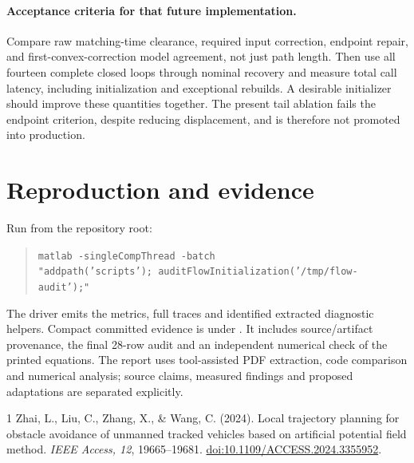 \documentclass[10pt]{article}
\begin{document}
\paragraph{Acceptance criteria for that future implementation.}
Compare raw matching-time clearance, required input correction, endpoint
repair, and first-convex-correction model agreement, not just path length.
Then use all fourteen complete closed loops through nominal recovery and
measure total call latency, including initialization and exceptional rebuilds.
A desirable initializer should improve these quantities together.
The present tail ablation fails the endpoint criterion, despite reducing
displacement, and is therefore not promoted into production.

\section{Reproduction and evidence}
Run from the repository root:
\begin{quote}\small
\texttt{matlab -singleCompThread -batch}\\
\texttt{"addpath('scripts'); auditFlowInitialization('/tmp/flow-audit');"}
\end{quote}
The driver emits the metrics, full traces and identified extracted diagnostic
helpers. Compact committed evidence is under
.
It includes source/artifact provenance, the final 28-row audit and an
independent numerical check of the printed equations.
The report uses tool-assisted PDF extraction, code comparison and numerical
analysis; source claims, measured findings and proposed adaptations are
separated explicitly.

\begin{thebibliography}{1}
Zhai, L., Liu, C., Zhang, X., \& Wang, C. (2024).
Local trajectory planning for obstacle avoidance of unmanned tracked vehicles
based on artificial potential field method.
\emph{IEEE Access, 12}, 19665--19681.
\href{https://doi.org/10.1109/ACCESS.2024.3355952}{doi:10.1109/ACCESS.2024.3355952}.
\end{thebibliography}
\end{document}
